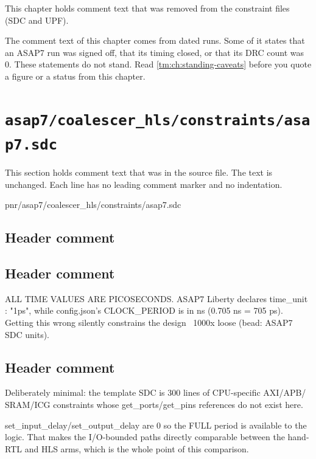 This chapter holds comment text that was removed from the constraint files (SDC and UPF).

\begin{information}
The comment text of this chapter comes from dated runs. Some of it states that an ASAP7 run was signed off, that its timing closed, or that its DRC count was 0. These statements do not stand. Read \cref{tm:ch:standing-caveats} before you quote a figure or a status from this chapter.
\end{information}

\section{\texttt{asap7/coalescer\_hls/constraints/asap7.sdc}}\label{tm:pd:asap7-coalescer-hls-sdc}

This section holds comment text that was in the source file. The text is unchanged. Each line has no leading comment marker and no indentation.

\begin{relocated}{pnr/asap7/coalescer_hls/constraints/asap7.sdc}

\subsection*{Header comment}


\subsection*{Header comment}

\begin{textblock}
ALL TIME VALUES ARE PICOSECONDS. ASAP7 Liberty declares time_unit : "1ps",
while config.json's CLOCK_PERIOD is in ns (0.705 ns = 705 ps). Getting this
wrong silently constrains the design ~1000x loose (bead: ASAP7 SDC units).
\end{textblock}

\subsection*{Header comment}

\begin{textblock}
Deliberately minimal: the template SDC is 300 lines of CPU-specific AXI/APB/
SRAM/ICG constraints whose get_ports/get_pins references do not exist here.

set_input_delay/set_output_delay are 0 so the FULL period is available to the
logic. That makes the I/O-bounded paths directly comparable between the
hand-RTL and HLS arms, which is the whole point of this comparison.
\end{textblock}

\end{relocated}

